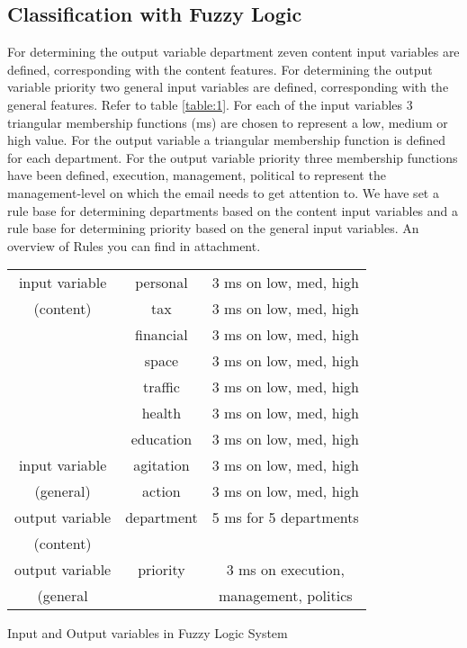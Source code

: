 \documentclass[journal]{IEEEtran}
\begin{document}
\subsection{Classification with Fuzzy Logic}

For determining the output variable department zeven content input variables are defined, corresponding with the content features. For determining the output variable priority two general input variables are defined, corresponding with the general features. Refer to table \ref{table:1}. For each of the input variables 3 triangular membership functions (ms) are chosen to represent a low, medium or high value. For the output variable a triangular membership function is defined for each department. For the output variable priority three membership functions have been defined, execution, management, political to represent the management-level on which the email needs to get attention to.  We have set a rule base for determining departments based on the content input variables and a rule base for determining priority based on the general input variables. An overview of Rules you can find in attachment. \\

\begin{center}
\begin{tabular}{ |c|c|c| }
 \hline
 input variable     & personal  & 3 ms on low, med, high    \\
 (content)          & tax       & 3 ms on low, med, high    \\
                    & financial & 3 ms on low, med, high    \\
                    & space     & 3 ms on low, med, high    \\
                    & traffic   & 3 ms on low, med, high    \\
                    & health    & 3 ms on low, med, high    \\
                    & education & 3 ms on low, med, high    \\
 input variable     & agitation & 3 ms on low, med, high    \\
 (general)          & action    & 3 ms on low, med, high    \\
 output variable    & department & 5 ms for 5 departments   \\
 (content)          &           &                           \\
 output variable    & priority  & 3 ms on execution,        \\
 (general           &           & management, politics      \\

\hline
\end{tabular}
\label{table:1}
Input and Output variables in Fuzzy Logic System
\end{center}
\end{document}
